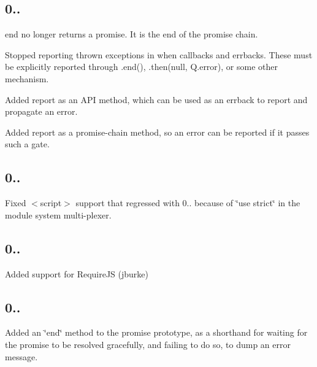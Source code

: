 \subsection*{0..}


\begin{DoxyItemize}
\item {\ttfamily end} no longer returns a promise. It is the end of the promise chain.
\item Stopped reporting thrown exceptions in {\ttfamily when} callbacks and errbacks. These must be explicitly reported through {\ttfamily .end()}, {\ttfamily .then(null, Q.\+error)}, or some other mechanism.
\item Added {\ttfamily report} as an A\+PI method, which can be used as an errback to report and propagate an error.
\item Added {\ttfamily report} as a promise-\/chain method, so an error can be reported if it passes such a gate.
\end{DoxyItemize}

\subsection*{0..}


\begin{DoxyItemize}
\item Fixed {\ttfamily $<$script$>$} support that regressed with 0.. because of \char`\"{}use strict\char`\"{} in the module system multi-\/plexer.
\end{DoxyItemize}

\subsection*{0..}


\begin{DoxyItemize}
\item Added support for Require\+JS (jburke)
\end{DoxyItemize}

\subsection*{0..}


\begin{DoxyItemize}
\item Added an \char`\"{}end\char`\"{} method to the promise prototype, as a shorthand for waiting for the promise to be resolved gracefully, and failing to do so, to dump an error message.
\end{DoxyItemize}

